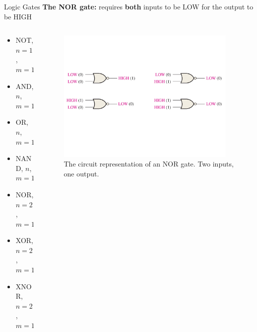 \documentclass{beamer}
\begin{document}
\begin{frame}{Logic Gates}
\textbf{The NOR gate:} requires \textbf{both} inputs to be LOW for the output to be HIGH \\ \vspace{0.5cm}
\begin{columns}[T]
\begin{column}{0.5\textwidth}
\begin{itemize}
\item \alert{NOT, $n=1$, $m=1$}
\item \alert{AND, $n$, $m=1$}
\item \alert{OR, $n$, $m=1$}
\item \alert{NAND, $n$, $m=1$}
\item \alert{NOR, $n=2$, $m=1$}
\item XOR, $n=2$, $m=1$
\item XNOR, $n=2$, $m=1$
\end{itemize}
\end{column}
\begin{column}{0.5\textwidth}
\begin{figure}
\centering
\includegraphics[width=0.95\textwidth,trim=0cm 6cm 0cm 6cm,clip=true]{figures/BasicNOR.pdf}
\caption{\label{fig:nor} The circuit representation of an NOR gate.  Two inputs, one output.}
\end{figure}
\end{column}
\end{columns}
\end{frame}
\end{document}
